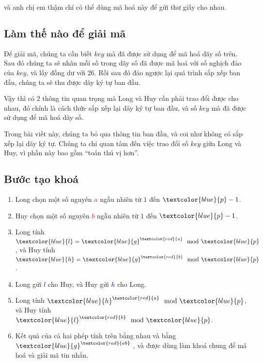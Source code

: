 \documentclass[a4paper,12pt]{article}
\begin{document}
và anh chị em thậm chí có thể dùng mã hoá này để gửi thư giấy cho nhau.

\subsection*{Làm thế nào để giải mã}

Để giải mã, chúng ta cần biết $key$ mà đã được sử dụng để mã hoá dãy số trên.
Sau đó chúng ta sẽ nhân mỗi số trong dãy số đã được mã hoá với số nghịch đảo của $key$,
và lấy đồng dư với 26. Rồi sau đó đảo ngược lại quá trình sắp xếp ban đầu, chúng ta sẽ thu được
dãy ký tự ban đầu.

Vậy thì có 2 thông tin quan trọng mà Long và Huy cần phải trao đổi được cho nhau,
đó chính là cách thức sắp xếp lại dãy ký tự ban đầu, và số $key$ mà đã được sử dụng để mã hoá dãy số.

Trong bài viết này, chúng ta bỏ qua thông tin ban đầu, và coi như không có sắp xếp lại dãy ký tự.
Chúng ta chỉ quan tâm đến việc trao đổi số $key$ giữa Long và Huy, vì phần này bao gồm ``toán thú vị hơn''.

\subsection*{Bước tạo khoá}

\begin{enumerate}
    \item Long chọn một số nguyên \textcolor{red}{$a$} ngẫu nhiên từ $1$ đến $\textcolor{blue}{p}-1$.
    \item Huy chọn một số nguyên \textcolor{red}{$b$} ngẫu nhiên từ $1$ đến $\textcolor{blue}{p}-1$.
    \item Long tính $\textcolor{blue}{l} = \textcolor{blue}{g}^{\textcolor{red}{a}} \mod \textcolor{blue}{p}$, và Huy tính $\textcolor{blue}{h} = \textcolor{blue}{g}^{\textcolor{red}{b}} \mod \textcolor{blue}{p}$.
    \item Long gửi \textcolor{blue}{$l$} cho Huy, và Huy gửi \textcolor{blue}{$h$} cho Long.
    \item Long tính $\textcolor{blue}{h}^{\textcolor{red}{a}} \mod \textcolor{blue}{p}$, và Huy tính $\textcolor{blue}{l}^{\textcolor{red}{b}} \mod \textcolor{blue}{p}$.
    \item Kết quả của cả hai phép tính trên bằng nhau và bằng \(\textcolor{blue}{g}^{\textcolor{red}{ab}}\) , và được dùng làm khoá chung để mã hoá và giải mã tin nhắn.
\end{enumerate}
\end{document}
